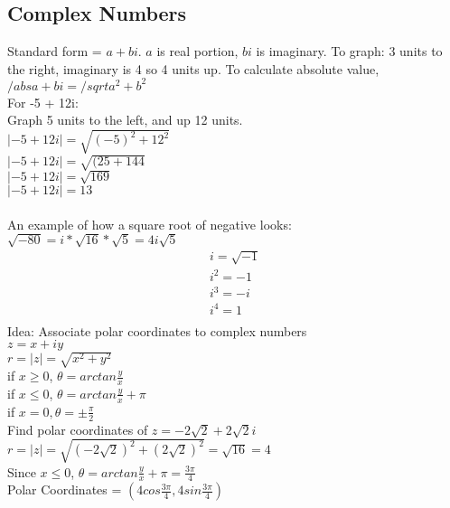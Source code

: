 \documentclass{article}
\begin{document}
        \subsection*{Complex Numbers}
            Standard form = $a + bi$. $a$ is real portion, $bi$ is imaginary. 
            To graph: 3 units to the right, imaginary is 4 so 4 units up. To calculate absolute value, $/abs{a+bi} = /sqrt{a^2 + b^2}$\\
            For -5 + 12i: \\
            Graph 5 units to the left, and up 12 units. \\
            $\lvert {-5 + 12i}\rvert = \sqrt{(-5)^2 + 12^2}$ \\
            $\lvert {-5 + 12i}\rvert = \sqrt{(25 + 144}$ \\
            $\lvert {-5 + 12i}\rvert = \sqrt{169}$ \\
            $\lvert {-5 + 12i}\rvert = 13$ \\
            \\
            An example of how a square root of negative looks: $\sqrt{-80} =  i * \sqrt{16} * \sqrt{5} = 4i \sqrt{5}$
            \begin{equation}
                \begin{split}
                    i = \sqrt{-1} \\
                    i^2 = -1 \\
                    i^3 = -i \\
                    i^4 = 1 \\
                \end{split}
            \end{equation}
            Idea: Associate polar coordinates to complex numbers \\
            $z = x+iy$ \\
            $r = \lvert z \rvert = \sqrt{x^2 + y^2}$ \\
            if $x \geq 0$, $\theta = arctan \frac{y}{x}$ \\
            if $x \leq 0$, $\theta = arctan \frac{y}{x} + \pi$ \\
            if $x = 0, \theta = \pm \frac{\pi}{2}$ \\ 
            Find polar coordinates of $z = -2\sqrt{2} + 2\sqrt{2}i$\\
            $r = \lvert z \rvert = \sqrt{(-2\sqrt{2})^2  + (2\sqrt{2})^2} = \sqrt{16} = 4$ \\
            Since $x \leq 0$, $\theta =  arctan \frac{y}{x} + \pi = \frac{3\pi}{4} $ \\
            Polar Coordinates = $(4cos\frac{3\pi}{4},4sin\frac{3\pi}{4})$
\end{document}

